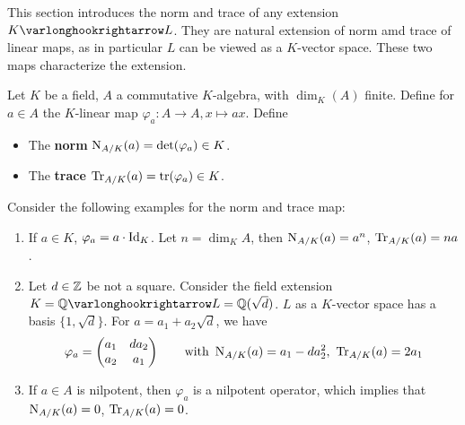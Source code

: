 \textstart
This section introduces the norm and trace of any extension $K \ext L$. They are natural extension of norm amd trace of linear maps, as in particular $L$ can be viewed as a $K$-vector space. These two maps characterize the extension.

\begin{definition}
    Let $K$ be a field, $A$ a commutative $K$-algebra, with $\dim_K(A)$ finite. Define for $a \in A$ the $K$-linear map $\varphi_a: A \to A, x \mapsto ax$. Define
    \begin{itemize}
        \item The \textbf{norm} $\operatorname{N}_{A/K}(a) = \det(\varphi_a) \in K$.
        \item The \textbf{trace} $\operatorname{Tr}_{A/K}(a) = \operatorname{tr}(\varphi_a) \in K$.
    \end{itemize}
\end{definition}

\begin{example}
    Consider the following examples for the norm and trace map:
    \begin{enumerate}[label=\arabic*)]
        \item If $a \in K$, $\varphi_a = a \cdot \mathrm{Id}_K$. Let $n = \dim_K A$, then $\operatorname{N}_{A/K}(a) = a^n$, $\operatorname{Tr}_{A/K}(a) = na$.
        \item Let $d \in \mathbb{Z}$ be not a square. Consider the field extension $K = \Q \ext L = \Q(\sqrt{d})$. $L$ as a $K$-vector space has a basis $\{1, \sqrt{d}\}$. For $a = a_1 + a_2 \sqrt{d}$, we have
        \[
            \varphi_a = 
            \begin{pmatrix}
                a_1 & d a_2 \\
                a_2 & a_1
            \end{pmatrix}
            \qquad \text{with}\ 
            \Norm_{A/K}(a) = a_1 - d a_2^2,\ \Tr_{A/K}(a) = 2a_1
        \]
        \item If $a \in A$ is nilpotent, then $\varphi_a$ is a nilpotent operator, which implies that $\operatorname{N}_{A/K}(a) = 0$, $\operatorname{Tr}_{A/K}(a) = 0$.
    \end{enumerate}
\end{example}

